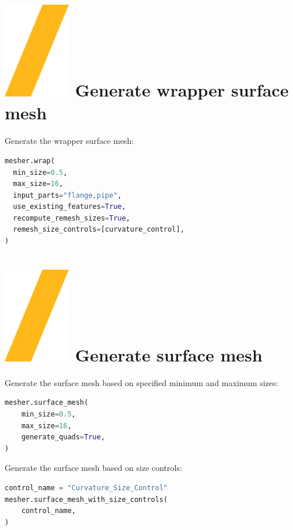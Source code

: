 \documentclass[9pt,landscape]{article}
\begin{document}
\begin{multicols}{3}
\section{\includegraphics[height=\fontcharht\font`\S]{slash.png} Generate wrapper surface mesh}
Generate the wrapper surface mesh:
\begin{lstlisting}[language=Python]
mesher.wrap(
  min_size=0.5,
  max_size=16,
  input_parts="flange,pipe",
  use_existing_features=True,
  recompute_remesh_sizes=True,
  remesh_size_controls=[curvature_control],
)
\end{lstlisting}

\section{\includegraphics[height=\fontcharht\font`\S]{slash.png} Generate surface mesh}
Generate the surface mesh based on specified minimum and maximum sizes: 
\begin{lstlisting}[language=Python]
mesher.surface_mesh(
    min_size=0.5,
    max_size=16,
    generate_quads=True,
)
\end{lstlisting}

Generate the surface mesh based on size controls:  
\begin{lstlisting}[language=Python]
control_name = "Curvature_Size_Control"
mesher.surface_mesh_with_size_controls(
    control_name,
)
\end{lstlisting}


\end{multicols}
\end{document}
